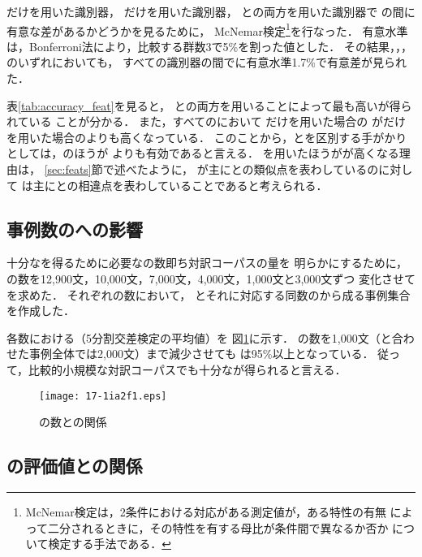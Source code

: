 \documentclass[japanese]{jnlp_1.4}
\newcommand{\AL}{}
\newcommand{\NAL}{}
\newcommand{\FLU}{}
\newcommand{\HUM}{}
\newcommand{\MT}{}
\newcommand{\ACC}{}
\newcommand{\MTS}{}
\newcommand{\MTF}{}
\newcommand{\MTL}{}
\begin{document}
{\AL}だけを用いた識別器，
{\NAL}だけを用いた識別器，
{\AL}と{\NAL}の両方を用いた識別器で
{\ACC}の間に有意な差があるかどうかを見るために，
McNemar検定\footnote{McNemar検定は，2条件における対応がある測定値が，ある特性の有無
によって二分されるときに，その特性を有する母比が条件間で異なるか否か
について検定する手法である\cite{Mori06}．}を行なった．
有意水準は，Bonferroni法により，比較する群数3で5\%を割った値とした．
その結果，{\MTS}，{\MTF}，{\MTL}のいずれにおいても，
すべての識別器の間で{\ACC}に有意水準1.7\%で有意差が見られた．

表\ref{tab:accuracy_feat}を見ると，
{\AL}と{\NAL}の両方を用いることによって最も高い{\ACC}が得られている
ことが分かる．
また，すべての{\MT}において
{\NAL}だけを用いた場合の
{\ACC}が{\AL}だけを用いた場合の{\ACC}よりも高くなっている．
このことから，{\HUM}と{\MT}を区別する手がかりとしては，{\NAL}のほうが
{\AL}よりも有効であると言える．
{\NAL}を用いたほうが{\ACC}が高くなる理由は，
\ref{sec:feats}節で述べたように，
{\AL}が主に{\HUM}と{\MT}の類似点を表わしているのに対して
{\NAL}は主に{\HUM}と{\MT}の相違点を表わしていることであると考えられる．



\subsection{事例数の{\ACC}への影響}
\label{sec:experiment:accuracy_datasize}

十分な{\ACC}を得るために必要な{\HUM}の数即ち対訳コーパスの量を
明らかにするために，
{\HUM}の数を12,900文，10,000文，7,000文，4,000文，1,000文と3,000文ずつ
変化させて{\ACC}を求めた．
それぞれの{\HUM}数において，
{\HUM}とそれに対応する同数の{\MT}から成る事例集合を作成した．

各{\HUM}数における{\ACC}（5分割交差検定の平均値）を
図\ref{fig:datasize}に示す．
{\HUM}の数を1,000文（{\MT}と合わせた事例全体では2,000文）まで減少させても
{\ACC}は95\%以上となっている．
従って，比較的小規模な対訳コーパスでも十分な{\ACC}が得られると言える．


\begin{figure}[b]
\begin{center}
\texttt{[image: 17-1ia2f1.eps]}
\end{center}
\caption{{\HUM}の数と{\ACC}の関係}
\label{fig:datasize}
\end{figure}



\subsection{{\FLU}の評価値と{\ACC}の関係}
\label{sec:experiment:accuracy_hum_eval}
\end{document}
